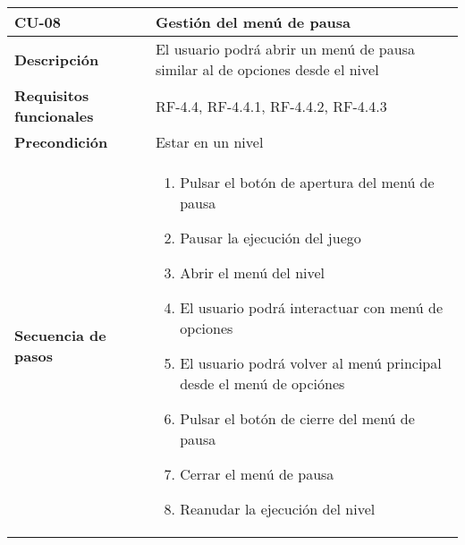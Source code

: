 \begin{longtable}{l|l}
\begin{minipage}{0.25\columnwidth}
\textbf{CU-08} 
\end{minipage}
&
\begin{minipage}{0.65\columnwidth}
Gestión del menú de pausa
\end{minipage}
\\ \hline

\begin{minipage}{0.25\columnwidth}
\textbf{Descripción} 
\end{minipage}
&
\begin{minipage}{0.65\columnwidth}
El usuario podrá abrir un menú de pausa similar al de opciones desde el nivel
\end{minipage}
\\ \hline

\begin{minipage}{0.25\columnwidth}
\textbf{Requisitos funcionales} 
\end{minipage}
&
\begin{minipage}{0.65\columnwidth}
RF-4.4, RF-4.4.1, RF-4.4.2, RF-4.4.3
\end{minipage}
\\ \hline

\begin{minipage}{0.25\columnwidth}
\textbf{Precondición} 
\end{minipage}
&
\begin{minipage}{0.65\columnwidth}
Estar en un nivel
\end{minipage}
\\ \hline

\begin{minipage}{0.25\columnwidth}
\textbf{Secuencia de pasos} 
\end{minipage}
&
\begin{minipage}{0.65\columnwidth}
\begin{enumerate}
\item
Pulsar el botón de apertura del menú de pausa
\item
Pausar la ejecución del juego
\item
Abrir el menú del nivel
\item
El usuario podrá interactuar con menú de opciones
\item
El usuario podrá volver al menú principal desde el menú de opciónes
\item
Pulsar el botón de cierre del menú de pausa
\item
Cerrar el menú de pausa
\item
Reanudar la ejecución del nivel
\end{enumerate}
\end{minipage}
\\ \hline


\end{longtable}
